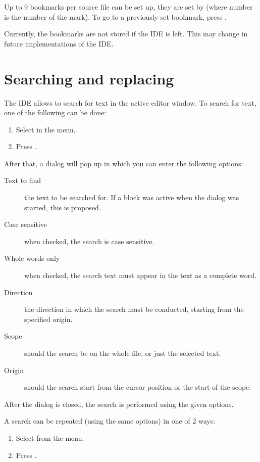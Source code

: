 Up to 9 bookmarks per source file can be set up, they are set by
 (where number is the number of the mark).
To go to a previously set bookmark, press .

\begin{remark}
Currently, the bookmarks are not stored if the IDE is left. This may
change in future implementations of the IDE.
\end{remark}

\section{Searching and replacing}
\label{se:searching}
The IDE allows to search for text in the active editor window. 
To search for text, one  of the following can be done:
\begin{enumerate}
\item Select  in the menu.
\item Press .
\end{enumerate}
After that, a dialog will pop up in which you can enter the following
options:
\begin{description}
\item[Text to find] the text to be searched for. If a block was active when
the dialog was started, this is proposed.
\item[Case sensitive] when checked, the search is case sensitive.
\item[Whole words only] when checked, the search text must appear in the
text as a complete word.
\item[Direction] the direction in which the search must be conducted,
starting from the specified origin.
\item[Scope] should the search be on the whole file, or just the selected
text.
\item[Origin] should the search start from the cursor position or the start
of the scope.
\end{description}
After the dialog is closed, the search is performed using the given options.

A search can be repeated (using the same options) in one of 2 ways:
\begin{enumerate}
\item Select  from the menu.
\item Press .
\end{enumerate}

